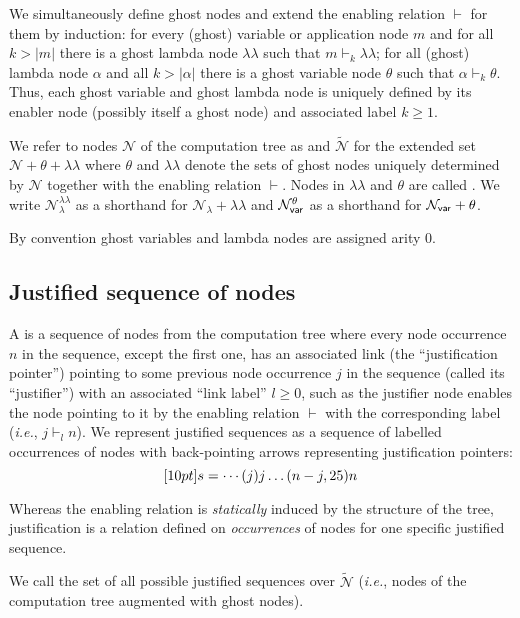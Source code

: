\documentclass{article}
\makeatletter
\theoremstyle{definition}
\newcommand\Nodes{\mathcal{N}}%
\newcommand\NodesVar{\Nodes_{\sf var}}%
\newcommand\NodesLmd{\Nodes_\lambda}%
\newcommand\ExtendedNodes{\tilde{\Nodes}}
\newcommand{\ghostlmd}{{\lambda\!\!\lambda}}
\newcommand{\ghostvar}{\theta}
\newcommand\ImNodesVar{\NodesVar^\ghostvar}
\newcommand\ImNodesLmd{\NodesLmd^\ghostlmd}
\newcommand{\enables}{\vdash} %
\renewcommand\ie{{\it i.e.\@\xspace}}
\makeatother
\begin{document}
We simultaneously define ghost nodes and extend the enabling relation $\enables$ for them by induction: for every (ghost) variable or application node $m$ and for all $k>|m|$ there is a ghost lambda node $\ghostlmd$ such that $m \enables_k \ghostlmd$; for all (ghost) lambda node $\alpha$ and all $k>|\alpha|$ there is a ghost variable node $\ghostvar$ such that $\alpha \enables_k \ghostvar$. Thus, each ghost variable and ghost lambda node is uniquely defined by its enabler node (possibly itself a ghost node) and associated label $k\geq 1$.

We refer to nodes $\Nodes$ of the computation tree as 
and $\ExtendedNodes$ for the extended set $\Nodes + \ghostvar + \ghostlmd$ where $\ghostvar$ and $\ghostlmd$ denote the sets of ghost nodes uniquely determined by $\Nodes$ together with the enabling relation $\enables$. Nodes in $\ghostlmd$ and $\ghostvar$ are called . We write $\ImNodesLmd$ as a shorthand for $\NodesLmd + \ghostlmd$ and $\ImNodesVar$ as a shorthand for $\NodesVar + \ghostvar$.

By convention ghost variables and lambda nodes are assigned arity $0$.

\subsection{Justified sequence of nodes}
\label{sec:justseq}

A  is a sequence of nodes from the computation tree where every node occurrence $n$ in the sequence, except the first one, has an associated link (the ``justification pointer'') pointing to some previous node occurrence $j$ in the sequence (called its ``justifier'') with an associated ``link label'' $l\geq0$, such as the justifier node enables the node pointing to it by the enabling relation $\enables$ with the corresponding label (\ie, $j \enables_l n$). We represent justified sequences as a sequence of labelled occurrences of nodes with back-pointing arrows representing justification pointers:
$$\Pstr[10pt]{ s = \cdots (j){j} \ldots (n-j,25){n} }$$

Whereas the enabling relation is \emph{statically} induced by the structure of the tree, justification is a relation defined on \emph{occurrences} of nodes for one specific justified sequence.

We call   the set of all possible
 justified sequences over $\ExtendedNodes$ (\ie, nodes of the computation tree augmented with ghost nodes).
\end{document}
